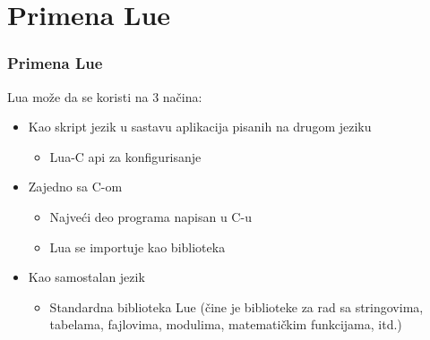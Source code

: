 \documentclass{beamer}
\begin{document}

\section{Primena Lue}
\begin{frame}
\frametitle{Primena Lue}

Lua može da se koristi na 3 načina:

\begin{itemize}

\item Kao skript jezik u sastavu aplikacija pisanih na drugom jeziku
\begin{itemize}
\item Lua-C api za konfigurisanje
\end{itemize}

\item Zajedno sa C-om
\begin{itemize}
\item Najveći deo programa napisan u C-u
\item Lua se importuje kao biblioteka
\end{itemize}

\item Kao samostalan jezik  
\begin{itemize}
\item Standardna biblioteka Lue (čine je biblioteke za rad sa stringovima, tabelama, fajlovima, modulima, matematičkim funkcijama, itd.)
\end{itemize}
 
\end{itemize}

\end{frame}

\end{document}
